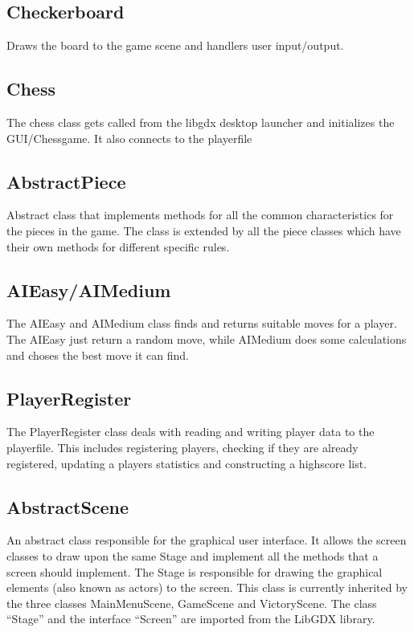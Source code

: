 \documentclass{article}
\begin{document}
\subsection {Checkerboard}
Draws the board to the game scene and handlers user input/output.

\subsection {Chess}
The chess class gets called from the libgdx desktop launcher and initializes the GUI/Chessgame. It also connects to the playerfile

\subsection {AbstractPiece}
Abstract class that implements methods for all the common characteristics for the pieces in the game. The class is extended by all the piece classes which have their own methods for different specific rules.

\subsection {AIEasy/AIMedium}
The AIEasy and AIMedium class finds and returns suitable moves for a player. The AIEasy just return a random move, while AIMedium does some calculations and choses the best move it can find.

\subsection {PlayerRegister}
The PlayerRegister class deals with reading and writing player data to the playerfile. This includes registering players, checking if they are already registered, updating a players statistics and constructing a highscore list.

\subsection {AbstractScene}
An abstract class responsible for the graphical user interface. It allows the screen classes to draw upon the same Stage and implement all the methods that a screen should implement. The Stage is responsible for drawing the graphical elements (also known as actors) to the screen. This class is currently inherited by the three classes MainMenuScene, GameScene and VictoryScene. The class “Stage”  and the interface “Screen” are imported from the LibGDX library.
\end{document}
